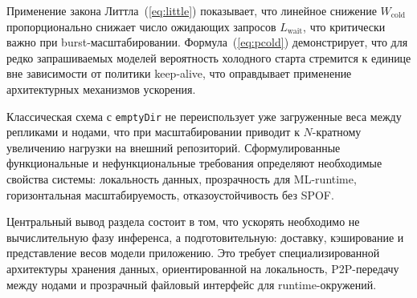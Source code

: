 Применение закона Литтла~(\ref{eq:little}) показывает, что линейное снижение $W_{\mathrm{cold}}$ пропорционально снижает число ожидающих запросов $L_{\mathrm{wait}}$, что критически важно при burst-масштабировании. Формула~(\ref{eq:pcold}) демонстрирует, что для редко запрашиваемых моделей вероятность холодного старта стремится к единице вне зависимости от политики keep-alive, что оправдывает применение архитектурных механизмов ускорения.

Классическая схема с \texttt{emptyDir} не переиспользует уже загруженные веса между репликами и нодами, что при масштабировании приводит к $N$-кратному увеличению нагрузки на внешний репозиторий. Сформулированные функциональные и нефункциональные требования определяют необходимые свойства системы: локальность данных, прозрачность для ML-runtime, горизонтальная масштабируемость, отказоустойчивость без SPOF.

Центральный вывод раздела состоит в том, что ускорять необходимо не вычислительную фазу инференса, а подготовительную: доставку, кэширование и представление весов модели приложению. Это требует специализированной архитектуры хранения данных, ориентированной на локальность, P2P-передачу между нодами и прозрачный файловый интерфейс для runtime-окружений.
